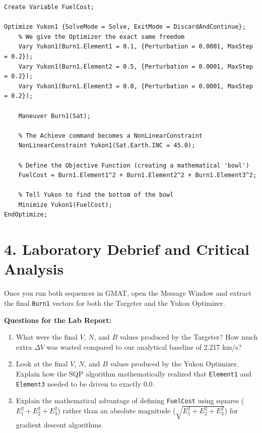 \documentclass[11pt, letterpaper]{article}
\begin{document}
\begin{lstlisting}[caption=The Optimizer Sequence (Yukon)]
% Create a Variable to store the cost
Create Variable FuelCost;

Optimize Yukon1 {SolveMode = Solve, ExitMode = DiscardAndContinue};
    % We give the Optimizer the exact same freedom
    Vary Yukon1(Burn1.Element1 = 0.1, {Perturbation = 0.0001, MaxStep = 0.2});
    Vary Yukon1(Burn1.Element2 = 0.5, {Perturbation = 0.0001, MaxStep = 0.2});
    Vary Yukon1(Burn1.Element3 = 0.0, {Perturbation = 0.0001, MaxStep = 0.2});
    
    Maneuver Burn1(Sat);
    
    % The Achieve command becomes a NonLinearConstraint
    NonLinearConstraint Yukon1(Sat.Earth.INC = 45.0);
    
    % Define the Objective Function (creating a mathematical 'bowl')
    FuelCost = Burn1.Element1^2 + Burn1.Element2^2 + Burn1.Element3^2;
    
    % Tell Yukon to find the bottom of the bowl
    Minimize Yukon1(FuelCost);
EndOptimize;
\end{lstlisting}

\section*{4. Laboratory Debrief and Critical Analysis}

Once you run both sequences in GMAT, open the Message Window and extract the final \texttt{Burn1} vectors for both the Targeter and the Yukon Optimizer.

\textbf{Questions for the Lab Report:}
\begin{enumerate}
    \item What were the final $V$, $N$, and $B$ values produced by the Targeter? How much extra $\Delta V$ was wasted compared to our analytical baseline of 2.217 km/s?
    \item Look at the final $V$, $N$, and $B$ values produced by the Yukon Optimizer. Explain how the SQP algorithm mathematically realized that \texttt{Element1} and \texttt{Element3} needed to be driven to exactly $0.0$.
    \item Explain the mathematical advantage of defining \texttt{FuelCost} using squares ($E_1^2 + E_2^2 + E_3^2$) rather than an absolute magnitude ($\sqrt{E_1^2 + E_2^2 + E_3^2}$) for gradient descent algorithms.
\end{enumerate}
\end{document}
